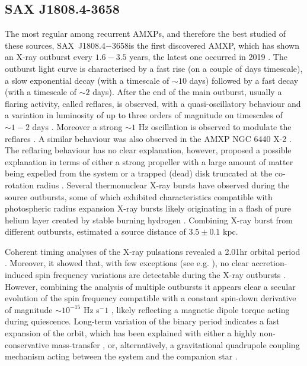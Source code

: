 \documentclass[graybox]{svmult}
\def \saxj{{\rm SAX~J1808.4$-$3658\xspace}}
\begin{document}
\subsection{SAX J1808.4-3658}

The most regular among recurrent AMXPs, and therefore the best studied of these sources, \saxj is the first discovered AMXP, which has shown an X-ray outburst every $1.6-3.5$ years, the latest one occurred in 2019 \cite{Bult2019c}. The outburst light curve is characterised by a fast rise (on a couple of days timescale), a slow exponential decay (with a timescale of $\sim 10$ days) followed by a fast decay (with a timescale of $\sim 2$ days). After the end of the main outburst, usually a flaring activity, called reflares, is observed, with a quasi-oscillatory behaviour and a variation in luminosity of up to three orders of magnitude on timescales of $\sim 1-2$ days \cite{Patruno2016}. Moreover a strong $\sim 1$ Hz oscillation is observed to modulate the reflares \cite{Bult2014}. A similar behaviour was also observed in the AMXP NGC 6440 X-2 \cite{Patruno2013}. The reflaring behaviour has no clear explanation, however, \cite{Patruno2016} proposed a possible explanation in terms of either a strong propeller with a large amount of matter being expelled from the system or a trapped (dead) disk truncated at the co-rotation radius \cite{DAngelo2012}.
Several thermonuclear X-ray bursts have observed during the source outbursts, some of which exhibited characteristics compatible with photospheric radius expansion X-ray bursts likely originating in a flash of pure helium layer created by stable burning hydrogen \cite{Galloway2006,Galloway2008}. Combining X-ray burst from different outbursts, \cite{Galloway2006} estimated a source distance of $3.5\pm0.1$ kpc.

Coherent timing analyses of the X-ray pulsations revealed a 2.01hr orbital period \cite{Chakrabarty1998}. Moreover, it showed that, with few exceptions (see e.g. \cite{Burderi2006}), no clear accretion-induced spin frequency variations are detectable during the X-ray outbursts \cite{Hartman2008,Patruno2012a,Patruno2017}. However, combining the analysis of multiple outbursts it appears clear a secular evolution of the spin frequency compatible with a constant spin-down derivative of magnitude $\sim10^{−15}$ Hz s$^−1$ \cite{Hartman2008,Patruno2012,Sanna2017c,Bult2019c}, likely reflecting a magnetic dipole torque acting during quiescence. Long-term variation of the binary period indicates a fast expansion of the orbit, which has been explained with either a highly non-conservative mass-transfer \cite{DiSalvo2008,Burderi2009, Sanna2017c}, or, alternatively, a gravitational quadrupole coupling mechanism acting between the system and the companion star \cite{Hartman2008,Patruno2012,Sanna2017c}.
\end{document}
